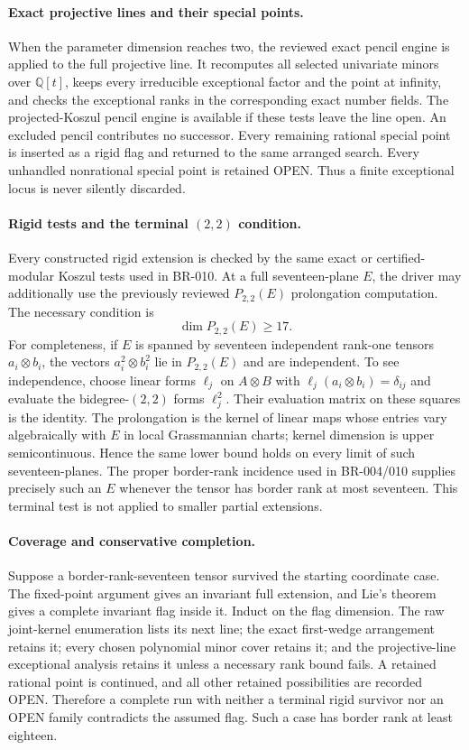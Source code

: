 \paragraph{Exact projective lines and their special points.}
When the parameter dimension reaches two, the reviewed exact pencil
engine is applied to the full projective line.  It recomputes all selected
univariate minors over $\mathbb Q[t]$, keeps every irreducible exceptional
factor and the point at infinity, and checks the exceptional ranks in the
corresponding exact number fields.  The projected-Koszul pencil engine
is available if these tests leave the line open.  An excluded pencil
contributes no successor.  Every remaining rational special point is
inserted as a rigid flag and returned to the same arranged search.
Every unhandled nonrational special point is retained OPEN.  Thus a
finite exceptional locus is never silently discarded.

\paragraph{Rigid tests and the terminal $(2,2)$ condition.}
Every constructed rigid extension is checked by the same exact or
certified-modular Koszul tests used in BR-010.  At a full seventeen-plane
$E$, the driver may additionally use the previously reviewed
$P_{2,2}(E)$ prolongation computation.  The necessary condition is
\[
 \dim P_{2,2}(E)\ge17.
\]
For completeness, if $E$ is spanned by seventeen independent rank-one
tensors $a_i\otimes b_i$, the vectors $a_i^2\otimes b_i^2$ lie in
$P_{2,2}(E)$ and are independent.  To see independence, choose linear
forms $\ell_j$ on $A\otimes B$ with
$\ell_j(a_i\otimes b_i)=\delta_{ij}$ and evaluate the bidegree-$(2,2)$
forms $\ell_j^2$.  Their evaluation matrix on these squares is the
identity.  The prolongation is the kernel of linear maps whose entries
vary algebraically with $E$ in local Grassmannian charts; kernel dimension
is upper semicontinuous.  Hence the same lower bound holds on every limit
of such seventeen-planes.  The proper border-rank incidence used in
BR-004/010 supplies precisely such an $E$ whenever the tensor has border
rank at most seventeen.  This terminal test is not applied to smaller
partial extensions.

\paragraph{Coverage and conservative completion.}
Suppose a border-rank-seventeen tensor survived the starting coordinate
case.  The fixed-point argument gives an invariant full extension, and
Lie's theorem gives a complete invariant flag inside it.  Induct on the
flag dimension.  The raw joint-kernel enumeration lists its next line;
the exact first-wedge arrangement retains it; every chosen polynomial
minor cover retains it; and the projective-line exceptional analysis
retains it unless a necessary rank bound fails.  A retained rational
point is continued, and all other retained possibilities are recorded
OPEN.  Therefore a complete run with neither a terminal rigid survivor
nor an OPEN family contradicts the assumed flag.  Such a case has border
rank at least eighteen.

